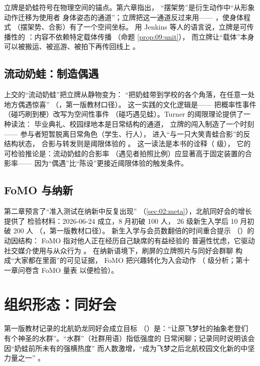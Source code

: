 立牌是奶蛙符号在物理空间的锚点。第六章指出，
“摆架势”是衍生动作中“从形象动作迁移为使用者
身体姿态的通道”；立牌把这一通道反过来用——
，使身体程式
（摆架势、合影）有了一个空间坐标。
用 Jenkins 等人的语言说，立牌是可传播性的
：内容不依赖特定载体传播
（命题 \ref{prop:09:unit}），
而立牌让“载体”本身可以被搬运、被巡游、被拍下再传回线上
\cite{jenkins2013spreadable}。

\subsection{流动奶蛙：制造偶遇}

上交的“流动奶蛙”把立牌从静物变为：
“把奶蛙带到学校的各个角落，在任意一处地方偶遇惊喜”
（，第一版教材口径）。
这一实践的文化逻辑是——
把概率性事件（碰巧刷到梗）改写为空间性事件
（碰巧遇见蛙）。Turner 的阈限理论提供了一种读法：
毕业典礼、校园绿地本是日常结构的通道，
立牌的闯入制造了一个时刻——
参与者短暂脱离日常角色（学生、行人），
进入“与一只大笑青蛙合影”的反结构状态，
合影与转发则是阈限体验的
\cite{turner1969ritual}。
这一读法是本书的诠释（ 级），
它的可检验推论是：流动奶蛙的合影率
（遇见者拍照比例）应显著高于固定装置的合影率——
因为“偶遇”比“陈设”更接近阈限体验的触发条件。

\subsection{FoMO 与纳新}

第二章预言了“准入测试在纳新中反复出现”
（\ref{sec:02:meta}），北航同好会的增长提供了
检验材料：2026-06-24 成立，8 月初破 100 人，
26 级新生入学后 10 月初破 200 人
（，第一版教材口径）。
新生入学与会员数翻倍的时间重合提示
（）的动因结构：
FoMO 指对他人正在经历自己缺席的有益经验的
普遍性忧虑，它驱动社交媒介使用与从众行为
\cite{przybylski2013fomo}。
在纳新语境下，刷屏的立牌照片与同好会群聊
构成“大家都在里面”的可见证据，
FoMO 把兴趣转化为入会动作
（ 级分析；第十一章问卷含 FoMO 量表
以便检验）。

\section{组织形态：同好会}\label{sec:10:org}

第一版教材记录的北航奶龙同好会成立目标
（）是：“让原飞梦社的抽象老登们
有个神圣的水群”。“水群”（社群用语）指低强度的
日常闲聊；记录同时说明该会因“奶蛙前所未有的强横热度”
而人数激增，“成为飞梦之后北航校园文化新的中坚力量之一”
。


